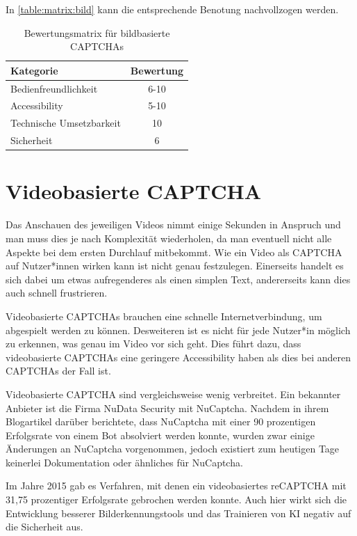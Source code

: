 In \autoref{table:matrix:bild} kann die entsprechende Benotung nachvollzogen werden.

\begin{table}[h!]
    \caption{Bewertungsmatrix für bildbasierte CAPTCHAs}
    \begin{center}
        \begin{tabular}{l|c}
            Kategorie                       & Bewertung \\\hline
            Bedienfreundlichkeit            & 6-10         \\
            Accessibility                   & 5-10        \\
            Technische Umsetzbarkeit        & 10         \\
            Sicherheit                      & 6         
        \end{tabular}
    \end{center}
    \label{table:matrix:bild}
\end{table}

\section{Videobasierte CAPTCHA}
Das Anschauen des jeweiligen Videos nimmt einige Sekunden in Anspruch und man muss dies je nach Komplexität wiederholen, 
da man eventuell nicht alle Aspekte bei dem ersten Durchlauf mitbekommt.
Wie ein Video als CAPTCHA auf Nutzer*innen wirken kann ist nicht genau festzulegen.
Einerseits handelt es sich dabei um etwas aufregenderes als einen simplen Text, andererseits kann dies auch schnell frustrieren.

Videobasierte CAPTCHAs brauchen eine schnelle Internetverbindung, um abgespielt werden zu können. 
Desweiteren ist es nicht für jede Nutzer*in möglich zu erkennen, was genau im Video vor sich geht.
Dies führt dazu, dass videobasierte CAPTCHAs eine geringere Accessibility haben als dies bei anderen CAPTCHAs der Fall ist. 

Videobasierte CAPTCHA sind vergleichsweise wenig verbreitet. 
Ein bekannter Anbieter ist die Firma NuData Security mit NuCaptcha.
Nachdem \citeauthor{elie} in ihrem Blogartikel  darüber berichtete, 
dass NuCaptcha mit einer 90 prozentigen Erfolgsrate von einem Bot absolviert werden konnte,
wurden zwar einige Änderungen an NuCaptcha vorgenommen, jedoch existiert zum heutigen Tage keinerlei Dokumentation oder ähnliches für NuCaptcha.

Im Jahre 2015 gab es Verfahren, mit denen ein videobasiertes reCAPTCHA mit 31,75 prozentiger Erfolgsrate gebrochen werden konnte. 
Auch hier wirkt sich die Entwicklung besserer Bilderkennungstools und das Trainieren von KI negativ auf die Sicherheit aus.\cite[p.79]{surveyofresearch}

